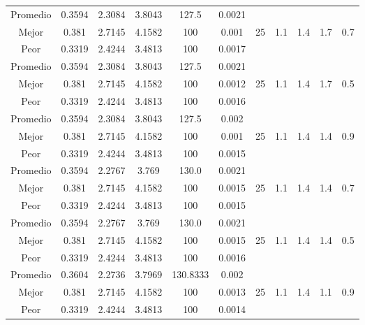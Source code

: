 \begin{table}[h!]
\begin{center}
\begin{tabular}{|c|c|c|c|c|c|c|c|c|c|c|}
        \hline
        \hline
            Promedio  & 0.3594 & 2.3084 & 3.8043 & 127.5 & 0.0021 &  &  &  &  & \\
            \cline{1-6}
            Mejor & 0.381 & 2.7145  & 4.1582 & 100 & 0.001 & 25 & 1.1 & 1.4 & 1.7 & 0.7\\
            \cline{1-6}
            Peor & 0.3319 & 2.4244  & 3.4813 & 100 & 0.0017 &  &  &  &  & \\
        \hline
        \hline
            Promedio  & 0.3594 & 2.3084 & 3.8043 & 127.5 & 0.0021 &  &  &  &  & \\
            \cline{1-6}
            Mejor & 0.381 & 2.7145  & 4.1582 & 100 & 0.0012 & 25 & 1.1 & 1.4 & 1.7 & 0.5\\
            \cline{1-6}
            Peor & 0.3319 & 2.4244  & 3.4813 & 100 & 0.0016 &  &  &  &  & \\
        \hline
        \hline
            Promedio  & 0.3594 & 2.3084 & 3.8043 & 127.5 & 0.002 &  &  &  &  & \\
            \cline{1-6}
            Mejor & 0.381 & 2.7145  & 4.1582 & 100 & 0.001 & 25 & 1.1 & 1.4 & 1.4 & 0.9\\
            \cline{1-6}
            Peor & 0.3319 & 2.4244  & 3.4813 & 100 & 0.0015 &  &  &  &  & \\
        \hline
        \hline
            Promedio  & 0.3594 & 2.2767 & 3.769 & 130.0 & 0.0021 &  &  &  &  & \\
            \cline{1-6}
            Mejor & 0.381 & 2.7145  & 4.1582 & 100 & 0.0015 & 25 & 1.1 & 1.4 & 1.4 & 0.7\\
            \cline{1-6}
            Peor & 0.3319 & 2.4244  & 3.4813 & 100 & 0.0015 &  &  &  &  & \\
        \hline
        \hline
            Promedio  & 0.3594 & 2.2767 & 3.769 & 130.0 & 0.0021 &  &  &  &  & \\
            \cline{1-6}
            Mejor & 0.381 & 2.7145  & 4.1582 & 100 & 0.0015 & 25 & 1.1 & 1.4 & 1.4 & 0.5\\
            \cline{1-6}
            Peor & 0.3319 & 2.4244  & 3.4813 & 100 & 0.0016 &  &  &  &  & \\
        \hline
        \hline
            Promedio  & 0.3604 & 2.2736 & 3.7969 & 130.8333 & 0.002 &  &  &  &  & \\
            \cline{1-6}
            Mejor & 0.381 & 2.7145  & 4.1582 & 100 & 0.0013 & 25 & 1.1 & 1.4 & 1.1 & 0.9\\
            \cline{1-6}
            Peor & 0.3319 & 2.4244  & 3.4813 & 100 & 0.0014 &  &  &  &  & \\

\end{tabular}
\end{center}
\end{table}
